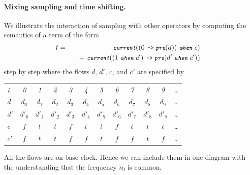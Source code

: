 {\paragraph{Mixing sampling and time shifting.}
We illustrate the interaction of sampling with other operators by
computing the semantics of a term of the form
%
\begin{eqnarray*}
t & = & \emph{\pp{current}}((0\ \emph{\pp{->}}\ 
\emph{\pp{pre}}(d))\ \emph{\pp{when}}\ c)\\
   &&\ \ \      +\ \emph{\pp{current}}((1\ 
   \emph{\pp{when}}\ c')\ \emph{\pp{->}}\ \emph{\pp{pre}}(d'\  \emph{\pp{when}}\ c'))
\end{eqnarray*}
%
step by step where the flows $d$, $d'$, $c$, and $c'$ are specified by
\begin{center}
  \leavevmode
  \begin{tabular}[]{l@{\quad}||@{\quad} ccccccccccc}
    \hline\hline  
     \hbox{{\footnotesize \textit{i}}} &{\footnotesize \textit{0}}
     &{\footnotesize \textit{1}}&{\footnotesize \textit{2}}
     &{\footnotesize \textit{3}}&{\footnotesize \textit{4}}
     &{\footnotesize \textit{5}}&{\footnotesize \textit{6}}
     &{\footnotesize \textit{7}}&{\footnotesize \textit{8}}
     &{\footnotesize \textit{9}}&\ldots
   \\      
    \hbox{$d$} 
    &$d_0$&$d_1$&$d_2$&$d_3$&$d_4$&$d_5$&$d_6$&$d_7$&$d_8$&$d_9$&\ldots
   \\
    \hbox{$d'$} 
    &$d'_0$&$d'_1$&$d'_2$&$d'_3$&$d'_4$&$d'_5$&$d'_6$
    &$d'_7$&$d'_8$&$d'_9$&\ldots
   \\
    \hbox{$c$} 
    &$f$&$t$&$t$&$f$&$t$&$t$&$f$&$t$&$t$&$t$&\ldots
   \\
    \hbox{$c'$} 
    &$f$&$t$&$t$&$f$&$f$&$t$&$f$&$f$&$t$&$f$&\ldots
   \\
   \hline\hline
  \end{tabular}
\end{center}
All the flows are on base clock. Hence we can include them in one diagram
with the understanding that the frequency $\nu_{0}$ is common.

}

